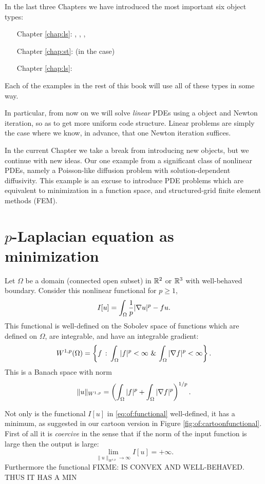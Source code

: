 
In the last three Chapters we have introduced the most important six \PETSc object types:
\begin{itemize}
\item[\quad Chapter \ref{chap:ls}:] \pVec, \pMat, \pKSP, \pPC
\item[\quad Chapter \ref{chap:st}:] \pDM (in the \pDMDA case)
\item[\quad Chapter \ref{chap:ls}:] \pSNES
\end{itemize}
Each of the examples in the rest of this book will use all of these types in some way.

In particular, from now on we will solve \emph{linear} PDEs using a \pSNES object and Newton iteration, so as to get more uniform code structure.  Linear problems are simply the case where we know, in advance, that one Newton iteration suffices.

In the current Chapter we take a break from introducing new \PETSc objects, but we continue with new ideas.  Our one example from a significant class of nonlinear PDEs, namely a Poisson-like diffusion problem with solution-dependent diffusivity.  This example is an excuse to introduce PDE problems which are equivalent to minimization in a function space, and structured-grid finite element methods (FEM).


\section{$p$-Laplacian equation as minimization}

Let $\Omega$ be a domain (connected open subset) in $\mathbb{R}^2$ or $\mathbb{R}^3$ with well-behaved boundary.  Consider this nonlinear functional for $p \ge 1$,
\begin{equation}
    I[u] = \int_\Omega \frac{1}{p} |\nabla u|^p - fu.  \label{eq:of:functional}
\end{equation}
This functional is well-defined on the Sobolev space of functions which are defined on $\Omega$, are integrable, and have an integrable gradient:
    $$W^{1,p}(\Omega) = \left\{f \,:\, \int_\Omega |f|^p < \infty \,\, \& \, \int_\Omega |\nabla f|^p < \infty\right\}.$$
This is a Banach space with norm
    $$\|u\|_{W^{1,p}} = \left(\int_\Omega |f|^p + \int_\Omega |\nabla f|^p\right)^{1/p}.$$

Not only is the functional $I[u]$ in \eqref{eq:of:functional} well-defined, it has a minimum, as suggested in our cartoon version in Figure \ref{fig:of:cartoonfunctional}.  First of all it is \emph{coercive} in the sense that if the norm of the input function is large then the output is large:
    $$\lim_{\|u\|_{W^{1,p}} \to \infty} I[u] = +\infty.$$
Furthermore the functional FIXME: IS CONVEX AND WELL-BEHAVED.  THUS IT HAS A MIN

